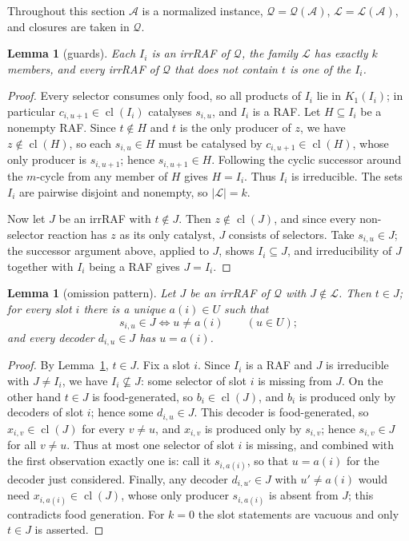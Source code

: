 \documentclass[11pt,a4paper]{article}
\theoremstyle{plain}
\newtheorem{lemma}[theorem]{Lemma}
\theoremstyle{definition}
\theoremstyle{remark}
\newcommand{\cl}{\operatorname{cl}}
\newcommand{\cL}{\mathcal{L}}
\newcommand{\cA}{\mathcal{A}}
\newcommand{\cQ}{\mathcal{Q}}
\begin{document}
Throughout this section $\cA$ is a normalized instance, $\cQ=\cQ(\cA)$, $\cL=\cL(\cA)$, and closures are taken in $\cQ$.

\begin{lemma}[guards]\label{lem:guards}
Each $I_i$ is an irrRAF of $\cQ$, the family $\cL$ has exactly $k$ members, and every irrRAF of $\cQ$ that does not contain $t$ is one of the $I_i$.
\end{lemma}

\begin{proof}
Every selector consumes only food, so all products of $I_i$ lie in $K_1(I_i)$; in particular $c_{i,u+1}\in\cl(I_i)$ catalyses $s_{i,u}$, and $I_i$ is a RAF. Let $H\subseteq I_i$ be a nonempty RAF. Since $t\notin H$ and $t$ is the only producer of $z$, we have $z\notin\cl(H)$, so each $s_{i,u}\in H$ must be catalysed by $c_{i,u+1}\in\cl(H)$, whose only producer is $s_{i,u+1}$; hence $s_{i,u+1}\in H$. Following the cyclic successor around the $m$-cycle from any member of $H$ gives $H=I_i$. Thus $I_i$ is irreducible. The sets $I_i$ are pairwise disjoint and nonempty, so $|\cL|=k$.

Now let $J$ be an irrRAF with $t\notin J$. Then $z\notin\cl(J)$, and since every non-selector reaction has $z$ as its only catalyst, $J$ consists of selectors. Take $s_{i,u}\in J$; the successor argument above, applied to $J$, shows $I_i\subseteq J$, and irreducibility of $J$ together with $I_i$ being a RAF gives $J=I_i$.
\end{proof}

\begin{lemma}[omission pattern]\label{lem:omission}
Let $J$ be an irrRAF of $\cQ$ with $J\notin\cL$. Then $t\in J$; for every slot $i$ there is a unique $a(i)\in U$ such that
\[
s_{i,u}\in J\iff u\neq a(i)\qquad(u\in U);
\]
and every decoder $d_{i,u}\in J$ has $u=a(i)$.
\end{lemma}

\begin{proof}
By Lemma~\ref{lem:guards}, $t\in J$. Fix a slot $i$. Since $I_i$ is a RAF and $J$ is irreducible with $J\ne I_i$, we have $I_i\not\subseteq J$: some selector of slot $i$ is missing from $J$. On the other hand $t\in J$ is food-generated, so $b_i\in\cl(J)$, and $b_i$ is produced only by decoders of slot $i$; hence some $d_{i,u}\in J$. This decoder is food-generated, so $x_{i,v}\in\cl(J)$ for every $v\ne u$, and $x_{i,v}$ is produced only by $s_{i,v}$; hence $s_{i,v}\in J$ for all $v\ne u$. Thus at most one selector of slot $i$ is missing, and combined with the first observation exactly one is: call it $s_{i,a(i)}$, so that $u=a(i)$ for the decoder just considered. Finally, any decoder $d_{i,u'}\in J$ with $u'\ne a(i)$ would need $x_{i,a(i)}\in\cl(J)$, whose only producer $s_{i,a(i)}$ is absent from $J$; this contradicts food generation. For $k=0$ the slot statements are vacuous and only $t\in J$ is asserted.
\end{proof}
\end{document}

